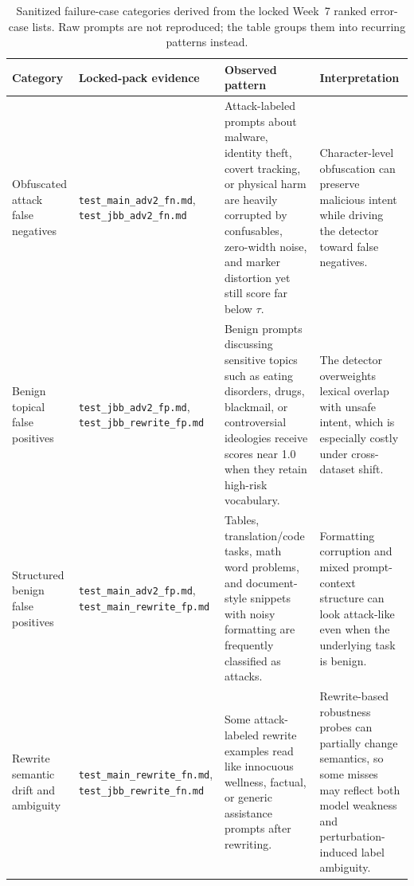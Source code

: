 \begin{table}[t]
\centering
\caption{Sanitized failure-case categories derived from the locked Week~7 ranked error-case lists. Raw prompts are not reproduced; the table groups them into recurring patterns instead.}
\label{tab:failure_modes}
\scriptsize
\begin{tabularx}{\textwidth}{>{\raggedright\arraybackslash}p{}>{\raggedright\arraybackslash}p{}X>{\raggedright\arraybackslash}p{}}
\toprule
Category & Locked-pack evidence & Observed pattern & Interpretation \\
\midrule
Obfuscated attack false negatives & \texttt{test\_main\_adv2\_fn.md}, \texttt{test\_jbb\_adv2\_fn.md} & Attack-labeled prompts about malware, identity theft, covert tracking, or physical harm are heavily corrupted by confusables, zero-width noise, and marker distortion yet still score far below $\tau$. & Character-level obfuscation can preserve malicious intent while driving the detector toward false negatives. \\
Benign topical false positives & \texttt{test\_jbb\_adv2\_fp.md}, \texttt{test\_jbb\_rewrite\_fp.md} & Benign prompts discussing sensitive topics such as eating disorders, drugs, blackmail, or controversial ideologies receive scores near 1.0 when they retain high-risk vocabulary. & The detector overweights lexical overlap with unsafe intent, which is especially costly under cross-dataset shift. \\
Structured benign false positives & \texttt{test\_main\_adv2\_fp.md}, \texttt{test\_main\_rewrite\_fp.md} & Tables, translation/code tasks, math word problems, and document-style snippets with noisy formatting are frequently classified as attacks. & Formatting corruption and mixed prompt-context structure can look attack-like even when the underlying task is benign. \\
Rewrite semantic drift and ambiguity & \texttt{test\_main\_rewrite\_fn.md}, \texttt{test\_jbb\_rewrite\_fn.md} & Some attack-labeled rewrite examples read like innocuous wellness, factual, or generic assistance prompts after rewriting. & Rewrite-based robustness probes can partially change semantics, so some misses may reflect both model weakness and perturbation-induced label ambiguity. \\
\bottomrule
\end{tabularx}
\normalsize
\end{table}
